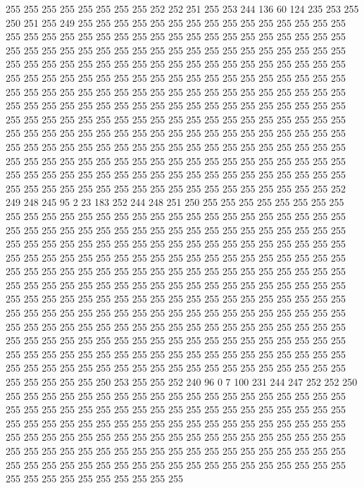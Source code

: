 255 255 255 255 255 255 255 255 252 252 251 255 253 244 136 60 124 235 253 255
250 251 255 249 255 255 255 255 255 255 255 255 255 255 255 255 255 255 255 255
255 255 255 255 255 255 255 255 255 255 255 255 255 255 255 255 255 255 255 255
255 255 255 255 255 255 255 255 255 255 255 255 255 255 255 255 255 255 255 255
255 255 255 255 255 255 255 255 255 255 255 255 255 255 255 255 255 255 255 255
255 255 255 255 255 255 255 255 255 255 255 255 255 255 255 255 255 255 255 255
255 255 255 255 255 255 255 255 255 255 255 255 255 255 255 255 255 255 255 255
255 255 255 255 255 255 255 255 255 255 255 255 255 255 255 255 255 255 255 255
255 255 255 255 255 255 255 255 255 255 255 255 255 255 255 255 255 255 255 255
255 255 255 255 255 255 255 255 255 255 255 255 255 255 255 255 255 255 255 255
255 255 255 255 255 255 255 255 255 255 255 255 255 255 255 255 255 255 255 255
255 255 255 255 255 255 255 255 255 255 255 255 255 255 255 255 255 255 255 255
255 255 255 255 255 255 255 255 255 255 255 255 255 255 255 255 255 255 255 255
255 255 255 255 255 255 252 249 248 245 95 2 23 183 252 244 248 251 250 255
255 255 255 255 255 255 255 255 255 255 255 255 255 255 255 255 255 255 255 255
255 255 255 255 255 255 255 255 255 255 255 255 255 255 255 255 255 255 255 255
255 255 255 255 255 255 255 255 255 255 255 255 255 255 255 255 255 255 255 255
255 255 255 255 255 255 255 255 255 255 255 255 255 255 255 255 255 255 255 255
255 255 255 255 255 255 255 255 255 255 255 255 255 255 255 255 255 255 255 255
255 255 255 255 255 255 255 255 255 255 255 255 255 255 255 255 255 255 255 255
255 255 255 255 255 255 255 255 255 255 255 255 255 255 255 255 255 255 255 255
255 255 255 255 255 255 255 255 255 255 255 255 255 255 255 255 255 255 255 255
255 255 255 255 255 255 255 255 255 255 255 255 255 255 255 255 255 255 255 255
255 255 255 255 255 255 255 255 255 255 255 255 255 255 255 255 255 255 255 255
255 255 255 255 255 255 255 255 255 255 255 255 255 255 255 255 255 255 255 255
255 255 255 255 255 255 255 255 255 255 255 255 255 255 255 255 255 255 255 255
250 253 255 255 252 240 96 0 7 100 231 244 247 252 252 250 255 255 255 255
255 255 255 255 255 255 255 255 255 255 255 255 255 255 255 255 255 255 255 255
255 255 255 255 255 255 255 255 255 255 255 255 255 255 255 255 255 255 255 255
255 255 255 255 255 255 255 255 255 255 255 255 255 255 255 255 255 255 255 255
255 255 255 255 255 255 255 255 255 255 255 255 255 255 255 255 255 255 255 255
255 255 255 255 255 255 255 255 255 255 255 255 255 255 255 255 255 255 255 255
255 255 255 255 255 255 255 255 255 255 255 255 255 255 255 255 255 255 255 255
